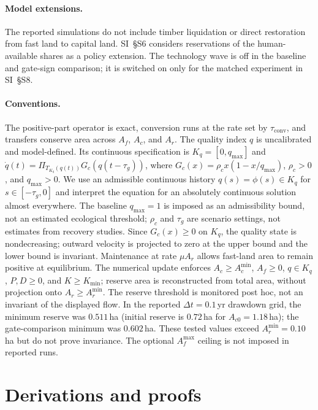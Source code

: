 \documentclass[11pt,a4paper]{article}
\newcommand{\Acmin}{A_c^{\min}}
\newcommand{\tconv}{\tau_{\mathrm{conv}}}
\begin{document}
\paragraph{Model extensions.} The reported simulations do not include timber liquidation or direct restoration from fast land to capital land. SI~\S S6 considers reservations of the human-available shares as a policy extension. The technology wave is off in the baseline and gate-sign comparison; it is switched on only for the matched experiment in SI~\S S8.

\paragraph{Conventions.} The positive-part operator is exact, conversion runs at the rate set by $\tconv$, and transfers conserve area across $A_f$, $A_c$, and $A_r$. The quality index $q$ is uncalibrated and model-defined. Its continuous specification is $K_q=[0,q_{\max}]$ and $\dot q(t)=\Pi_{T_{K_q}(q(t))}G_c(q(t-\tau_g))$, where $G_c(x)=\rho_cx(1-x/q_{\max})$, $\rho_c>0$, and $q_{\max}>0$. We use an admissible continuous history $q(s)=\phi(s)\in K_q$ for $s\in[-\tau_g,0]$ and interpret the equation for an absolutely continuous solution almost everywhere. The baseline $q_{\max}=1$ is imposed as an admissibility bound, not an estimated ecological threshold; $\rho_c$ and $\tau_g$ are scenario settings, not estimates from recovery studies. Since $G_c(x)\ge0$ on $K_q$, the quality state is nondecreasing; outward velocity is projected to zero at the upper bound and the lower bound is invariant. Maintenance at rate $\mu A_r$ allows fast-land area to remain positive at equilibrium. The numerical update enforces $A_c\ge\Acmin$, $A_f\ge0$, $q\in K_q$, $P,D\ge0$, and $K\ge K_{\min}$; reserve area is reconstructed from total area, without projection onto $A_r\ge A_r^{\min}$. The reserve threshold is monitored post hoc, not an invariant of the displayed flow. In the reported $\Delta t=0.1$\,yr drawdown grid, the minimum reserve was $0.511$\,ha (initial reserve is $0.72$\,ha for $A_{c0}=1.18$\,ha); the gate-comparison minimum was $0.602$\,ha. These tested values exceed $A_r^{\min}=0.10$\,ha but do not prove invariance. The optional $A_f^{\max}$ ceiling is not imposed in reported runs.

\section{Derivations and proofs}\label{si:proofs}
\end{document}

